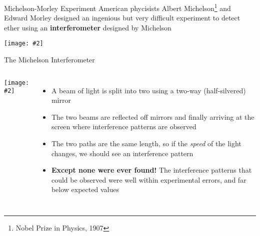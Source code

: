 \documentclass[12pt,compress,aspectratio=169]{beamer}
\newcommand{\pic}[2]{\texttt{[image: \#2]}}
\begin{document}
\begin{frame}{Michelson-Morley Experiment}
  American phycisists Albert Michelson\footnote{Nobel Prize in Physics, 1907}
  and Edward Morley designed an ingenious but very difficult experiment to
  detect ether using an \textbf{interferometer} designed by Michelson
  \begin{center}
    \pic{.7}{graphics/michelsonmorley.jpg}
  \end{center}
\end{frame}



\begin{frame}{The Michelson Interferometer}
  \begin{columns}
    \begin{center}
      \pic{1.15}{graphics/313754.png}
    \end{center}

    \begin{itemize}
    \item A beam of light is split into two using a two-way (half-silvered)
      mirror
    \item The two beams are reflected off mirrors and finally arriving at the
      screen where interference patterns are observed
    \item The two paths are the same length, so if the \emph{speed} of the light
      changes, we should see an interference pattern
    \item\textbf{Except none were ever found!} The interference patterns that
      could be observed were well within experimental errors, and far below
      expected values
    \end{itemize}
  \end{columns}
\end{frame}
\end{document}
